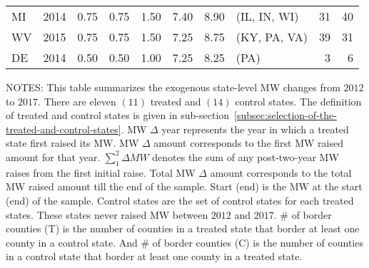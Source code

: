 \begin{table}[H]
{\begin{tabular}{lrrrrrrlrr}
            MI             & 2014             & 0.75               & 0.75                    & 1.50                     & 7.40     & 8.90   & (IL, IN, WI)   & 31                        & 40                        \\
            WV             & 2015             & 0.75               & 0.75                    & 1.50                     & 7.25     & 8.75   & (KY, PA, VA)   & 39                        & 31                        \\
            DE             & 2014             & 0.50               & 0.50                    & 1.00                     & 7.25     & 8.25   & (PA)           & 3                         & 6                         \\ \bottomrule\bottomrule
        \end{tabular}
    }
    \begin{minipage}{17.5cm}
        \vspace{0.01in}
        \tiny NOTES: This table summarizes the exogenous state-level MW changes from $2012$ to $2017$. There are eleven $(11)$ treated and $(14)$ control states. The definition of treated and control states is given in sub-section~\ref{subsec:selection-of-the-treated-and-control-states}. MW $\Delta$ year represents the year in which a treated state first raised its MW. MW $\Delta$ amount corresponds to the first MW raised amount for that year. $\sum_{1}^{2}\Delta MW$ denotes the sum of any post-two-year MW raises from the first initial raise. Total MW $\Delta$ amount corresponds to the total MW raised amount till the end of the sample. Start (end) is the MW at the start (end) of the sample. Control states are the set of control states for each treated states. These states never raised MW between $2012$ and $2017$. \# of border counties (T) is the number of counties in a treated state that border at least one county in a control state. And \# of border counties (C) is the number of counties in a control state that border at least one county in a treated state.
    \end{minipage}
\end{table}
